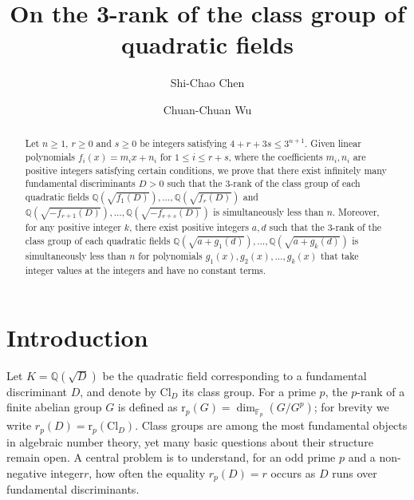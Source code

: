 \documentclass{amsart}
\begin{document}
\title[On the 3-rank  
of the class group  of quadratic fields]{On the 3-rank  
of the class group  of quadratic fields}
 \author[S.-C. Chen]{Shi-Chao Chen}

 \address{ Department of Mathematics
 and Statistics Sciences, Henan University, Kaifeng, 475004, China}

 \author[C.-C. Wu]{Chuan-Chuan Wu}
 \address{ Department of Mathematics
 and Statistics Sciences, Henan University, Kaifeng, 475004, China}







\begin{abstract}
Let $n\ge1$,   $r\ge0$ and $s\ge0$ be integers satisfying $4+r+3 s\le3^{n+1}$. Given linear polynomials
$f_{i}(x)=m_{i} x+n_{i}$ for $1 \le i \le r+s$, where  the   coefficients $m_{i} , n_{i}$ are positive integers satisfying certain conditions, we prove that  there exist infinitely many fundamental discriminants $D>0$  such that the 3-rank of the class group of each quadratic fields
$\mathbb{Q}(\sqrt{f_1(D)}), \ldots, \mathbb{Q}(\sqrt{f_r(D)})$ and  $\mathbb{Q}(\sqrt{-f_{r+1}(D)}), \ldots, \mathbb{Q}(\sqrt{-f_{r+s}(D)})$ is  simultaneously less than $n$.
Moreover, for any positive integer $k$, there exist positive integers $a, d$ such that the 3-rank of the class group of   each quadratic fields
$\mathbb{Q}(\sqrt{a+g_1(d)}), \ldots,\mathbb{Q}(\sqrt{a+g_k(d)})$ is simultaneously less than $n$  for polynomials $g_1(x), g_2(x), \ldots, g_k(x)$  that take integer values at the integers and have no constant terms.
\end{abstract}

\maketitle

\section{Introduction}
Let \(K = \mathbb{Q}(\sqrt{D})\) be the quadratic field corresponding to a fundamental discriminant \(D\), and denote by \(\mathrm{Cl}_{D}\) its class group. For a prime \(p\), the \(p\)-rank of a finite abelian group \(G\) is defined as \(\mathrm{r}_{p}(G) = \dim_{\mathbb{F}_{p}}(G / G^{p})\); for brevity we write \(r_{p}(D) = \mathrm{r}_{p}(\mathrm{Cl}_{D})\). Class groups are among the most fundamental objects in algebraic number theory, yet many basic questions about their structure remain open. A central problem is to understand, for an odd prime \(p\) and a non-negative integer\(r\), how often the equality \(r_{p}(D) = r\) occurs as \(D\) runs over fundamental discriminants.
\end{document}
